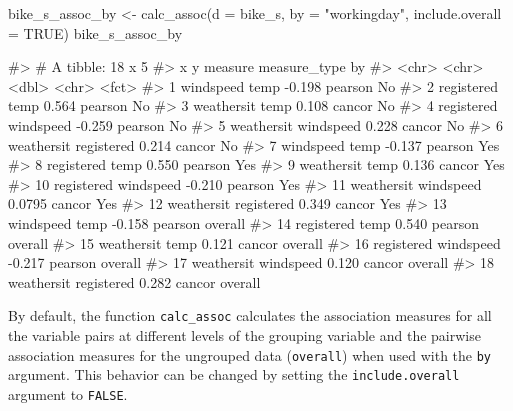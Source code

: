 \begin{Schunk}
\begin{Sinput}
bike_s_assoc_by <- calc_assoc(d = bike_s,
                            by = "workingday",
                            include.overall = TRUE)
bike_s_assoc_by
\end{Sinput}
\begin{Soutput}
#> # A tibble: 18 x 5
#>    x          y          measure measure_type by     
#>    <chr>      <chr>        <dbl> <chr>        <fct>  
#>  1 windspeed  temp       -0.198  pearson      No     
#>  2 registered temp        0.564  pearson      No     
#>  3 weathersit temp        0.108  cancor       No     
#>  4 registered windspeed  -0.259  pearson      No     
#>  5 weathersit windspeed   0.228  cancor       No     
#>  6 weathersit registered  0.214  cancor       No     
#>  7 windspeed  temp       -0.137  pearson      Yes    
#>  8 registered temp        0.550  pearson      Yes    
#>  9 weathersit temp        0.136  cancor       Yes    
#> 10 registered windspeed  -0.210  pearson      Yes    
#> 11 weathersit windspeed   0.0795 cancor       Yes    
#> 12 weathersit registered  0.349  cancor       Yes    
#> 13 windspeed  temp       -0.158  pearson      overall
#> 14 registered temp        0.540  pearson      overall
#> 15 weathersit temp        0.121  cancor       overall
#> 16 registered windspeed  -0.217  pearson      overall
#> 17 weathersit windspeed   0.120  cancor       overall
#> 18 weathersit registered  0.282  cancor       overall
\end{Soutput}
\end{Schunk}

By default, the function \texttt{calc\_assoc} calculates the association
measures for all the variable pairs at different levels of the grouping
variable and the pairwise association measures for the ungrouped data
(\texttt{overall}) when used with the \texttt{by} argument. This
behavior can be changed by setting the \texttt{include.overall} argument
to \texttt{FALSE}.

